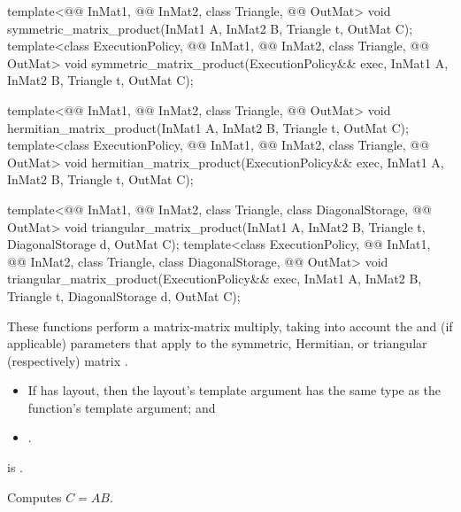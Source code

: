 \begin{itemdecl}
  template<@@ InMat1, @@ InMat2, class Triangle, @@ OutMat>
    void symmetric_matrix_product(InMat1 A, InMat2 B, Triangle t, OutMat C);
  template<class ExecutionPolicy,
           @@ InMat1, @@ InMat2, class Triangle, @@ OutMat>
    void symmetric_matrix_product(ExecutionPolicy&& exec,
                                  InMat1 A, InMat2 B, Triangle t, OutMat C);

  template<@@ InMat1, @@ InMat2, class Triangle, @@ OutMat>
    void hermitian_matrix_product(InMat1 A, InMat2 B, Triangle t, OutMat C);
  template<class ExecutionPolicy,
           @@ InMat1, @@ InMat2, class Triangle, @@ OutMat>
    void hermitian_matrix_product(ExecutionPolicy&& exec,
                                  InMat1 A, InMat2 B, Triangle t, OutMat C);

  template<@@ InMat1, @@ InMat2, class Triangle, class DiagonalStorage,
           @@ OutMat>
    void triangular_matrix_product(InMat1 A, InMat2 B, Triangle t, DiagonalStorage d, OutMat C);
  template<class ExecutionPolicy,
           @@ InMat1, @@ InMat2, class Triangle, class DiagonalStorage,
           @@ OutMat>
    void triangular_matrix_product(ExecutionPolicy&& exec,
                                   InMat1 A, InMat2 B, Triangle t, DiagonalStorage d, OutMat C);
\end{itemdecl}

\begin{itemdescr}
\pnum
These functions perform a matrix-matrix multiply,
taking into account
the  and  (if applicable) parameters
that apply to the symmetric, Hermitian, or triangular (respectively) matrix .

\pnum
\mandates
\begin{itemize}
\item
If  has  layout,
then the layout's  template argument has
the same type as the function's  template argument; and
\item
{}.
\end{itemize}

\pnum
\expects
{} is .

\pnum
\effects
Computes $C = A B$.
\end{itemdescr}

